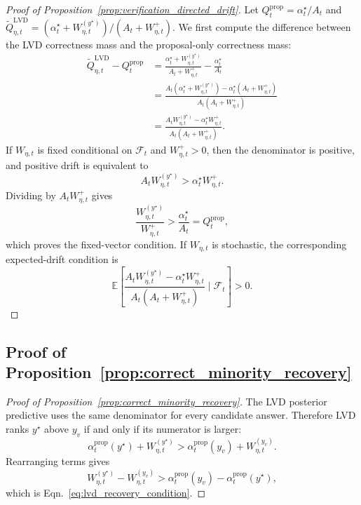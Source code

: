\documentclass{article}
\newcommand{\eqnref}[1]{Eqn.~\eqref{#1}}
\newcommand{\propref}[1]{Proposition~\ref{#1}}
\begin{document}
\begin{proof}[Proof of \propref{prop:verification_directed_drift}]
Let
$Q_t^{\mathrm{prop}}=\alpha_t^\star/A_t$ and
$\widetilde Q_{\eta,t}^{\mathrm{LVD}}=
(\alpha_t^\star+W_{\eta,t}^{(y^\star)})/(A_t+W_{\eta,t}^+)$.
We first compute the difference between the LVD correctness mass and the
proposal-only correctness mass:
\[
\begin{aligned}
    \widetilde Q_{\eta,t}^{\mathrm{LVD}}-Q_t^{\mathrm{prop}}
    &=
    \frac{\alpha_t^\star+W_{\eta,t}^{(y^\star)}}{A_t+W_{\eta,t}^+}
    -
    \frac{\alpha_t^\star}{A_t}\\
    &=
    \frac{
    A_t(\alpha_t^\star+W_{\eta,t}^{(y^\star)})
    -
    \alpha_t^\star(A_t+W_{\eta,t}^+)
    }{
    A_t(A_t+W_{\eta,t}^+)
    }\\
    &=
    \frac{
    A_tW_{\eta,t}^{(y^\star)}
    -
    \alpha_t^\star W_{\eta,t}^+
    }{
    A_t(A_t+W_{\eta,t}^+)
    }.
\end{aligned}
\]
If $W_{\eta,t}$ is fixed conditional on $\mathcal F_t$ and
$W_{\eta,t}^+>0$, then the denominator is positive, and positive drift is
equivalent to
\[
    A_tW_{\eta,t}^{(y^\star)}
    >
    \alpha_t^\star W_{\eta,t}^+.
\]
Dividing by $A_tW_{\eta,t}^+$ gives
\[
    \frac{W_{\eta,t}^{(y^\star)}}{W_{\eta,t}^+}
    >
    \frac{\alpha_t^\star}{A_t}
    =
    Q_t^{\mathrm{prop}},
\]
which proves the fixed-vector condition.
If $W_{\eta,t}$ is stochastic, the corresponding expected-drift condition is
\[
    \mathbb E\!\left[
    \frac{
    A_tW_{\eta,t}^{(y^\star)}
    -
    \alpha_t^\star W_{\eta,t}^+
    }{
    A_t(A_t+W_{\eta,t}^+)
    }
    \mid
    \mathcal F_t
    \right]
    >
    0.
\]
\end{proof}

\subsection{Proof of \propref{prop:correct_minority_recovery}}
\label{app:proof_correct_minority_recovery}

\begin{proof}[Proof of \propref{prop:correct_minority_recovery}]
The LVD posterior predictive uses the same denominator for every candidate
answer. Therefore LVD ranks $y^\star$ above $y_v$ if and only if its numerator
is larger:
\[
    \alpha_t^{\mathrm{prop}}(y^\star)+W_{\eta,t}^{(y^\star)}
    >
    \alpha_t^{\mathrm{prop}}(y_v)+W_{\eta,t}^{(y_v)}.
\]
Rearranging terms gives
\[
    W_{\eta,t}^{(y^\star)}-W_{\eta,t}^{(y_v)}
    >
    \alpha_t^{\mathrm{prop}}(y_v)-\alpha_t^{\mathrm{prop}}(y^\star),
\]
which is \eqnref{eq:lvd_recovery_condition}.
\end{proof}
\end{document}
